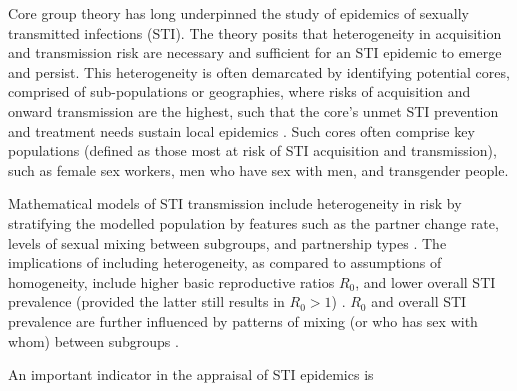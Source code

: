 
Core group theory has long underpinned the study of
epidemics of sexually transmitted infections (STI). %
The theory posits that heterogeneity in
acquisition and transmission risk are
necessary and sufficient for
an STI epidemic to emerge and persist.  %
This heterogeneity is often demarcated by identifying potential cores,
comprised of sub-populations or geographies,
where risks of acquisition and onward transmission are the highest,
such that the core's unmet STI prevention and treatment needs
sustain local epidemics \citep{Yorke1978,Gesink2011}.
Such cores often comprise key populations (defined as those most at risk of STI acquisition and transmission), 
such as  %
female sex workers,
men who have sex with men,
and transgender people. %
\par
Mathematical models of STI transmission include heterogeneity in risk
by stratifying the modelled population by features such as %
the partner change rate,
levels of sexual mixing between subgroups, and
partnership types \citep{Mishra2012}.				%
The implications of including heterogeneity,
as compared to assumptions of homogeneity, include
higher basic reproductive ratios $R_0$, and
lower overall STI prevalence
(provided the latter still results in $R_0 > 1$) \citep{Boily1997}.	
$R_0$ and overall STI prevalence are further influenced by
patterns of mixing (or who has sex with whom) between subgroups \citep{Stigum1994,Boily1997}.
\par %
An important indicator in the appraisal of STI epidemics is
